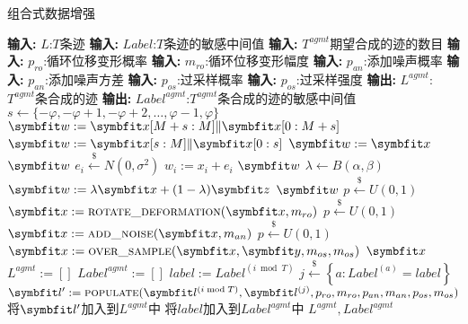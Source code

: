 {	\begin{breakablealgorithm}
		\caption{组合式数据增强}\label{alg:combined-da}
		\begin{algorithmic}[1]
			\Statex \textbf{输入:} $L$:$T$条迹
			\Statex \textbf{输入:} $Label$:$T$条迹的敏感中间值
			\Statex \textbf{输入:} $T^{agmt}$期望合成的迹的数目
			\Statex \textbf{输入:} $p_{ro}$:循环位移变形概率
			\Statex \textbf{输入:} $m_{ro}$:循环位移变形幅度
			\Statex \textbf{输入:} $p_{an}$:添加噪声概率
			\Statex \textbf{输入:} $p_{an}$:添加噪声方差
			\Statex \textbf{输入:} $p_{os}$:过采样概率
			\Statex \textbf{输入:} $p_{os}$:过采样强度
			\Statex \textbf{输出:} $L^{agmt}$:$T^{agmt}$条合成的迹
			\Statex \textbf{输出:} $Label^{agmt}$:$T^{agmt}$条合成的迹的敏感中间值
				\State $s\gets\{-\varphi,-\varphi+1,-\varphi+2,\dots,\varphi-1,\varphi\}$
					\State $\Vector w:=\Vector x[M+s:M]\Vert\Vector x[0:M+s]$
					\State $\Vector w:=\Vector x[s:M]\Vert\Vector x[0:s]$
				\Else
					\State $\Vector w:=\Vector x$
				\EndIf
				\State \Return $\Vector w$
			\EndFunction
			\Statex 
					\State $e_i\stackrel{\$}\gets N(0,\sigma^2)$
					\State $w_i:= x_i+e_i$
				\EndFor
				\State \Return $\Vector w$
			\EndFunction
			\Statex 
				\State $\lambda\gets B(\alpha,\beta)$
				\State $\Vector w:=\lambda\Vector x+(1-\lambda)\Vector z$
				\State \Return $\Vector w$
			\EndFunction
			\Statex 
				\State $p\stackrel{\$}\gets U(0,1)$
					\State $\Vector x:= \textsc {rotate\_deformation}(\Vector x,m_{ro})$
				\EndIf
				\State $p\stackrel{\$}\gets U(0,1)$
					\State $\Vector x:= \textsc{add\_noise}(\Vector x,m_{an})$
				\EndIf
				\State $p\stackrel{\$}\gets U(0,1)$
					\State $\Vector x:= \textsc{over\_sample}(\Vector x,\Vector y,m_{os},m_{os})$
				\EndIf
				\State \Return $\Vector x$
			\EndFunction
			\Statex 
			\State $L^{agmt}:=[]$
			\State $Label^{agmt}:=[]$
				\State $label:=Label^{(i\bmod T)}$
				\State $j\stackrel{\$}\gets\left\lbrace a:Label^{(a)}=label\right\rbrace $
				\State $\Vector {l^\prime}:=\textsc{populate}(\Vector {l^{(i\bmod T)}},\Vector l^{(j)},p_{ro},m_{ro},p_{an},m_{an},p_{os},m_{os})$
				\State 将$\Vector {l^\prime}$加入到$L^{agmt}$中
				\State 将$label$加入到$Label^{agmt}$中
			\EndFor
			\State \Return $L^{agmt},Label^{agmt}$
		\end{algorithmic}
	\end{breakablealgorithm}

}
